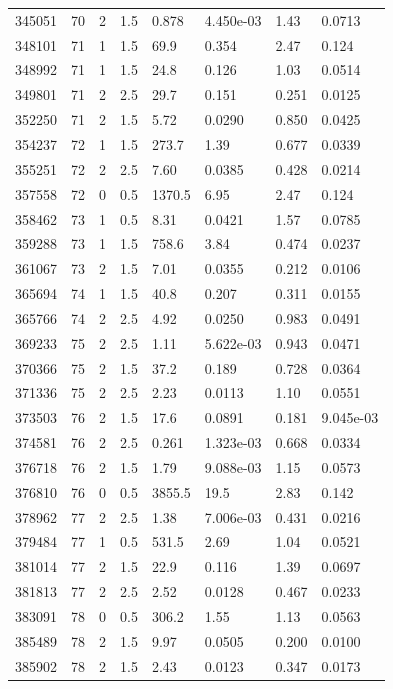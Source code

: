 \documentclass[preview]{standalone}
\begin{document}
{{{{{{\begin{tabular}{L{1.2cm}C{1.2cm} C{0.3cm}C{0.5cm} C{1.4cm}C{1.4cm} C{1.4cm}C{1.4cm}}
  345051  &    70  & 2     & 1.5 &  0.878  & 4.450e-03  & 1.43 &  0.0713   \\ 
  348101  &    71  & 1     & 1.5 &  69.9  & 0.354  & 2.47 &  0.124   \\ 
  348992  &    71  & 1     & 1.5 &  24.8  & 0.126  & 1.03 &  0.0514   \\ 
  349801  &    71  & 2     & 2.5 &  29.7  & 0.151  & 0.251 &  0.0125   \\ 
  352250  &    71  & 2     & 1.5 &  5.72  & 0.0290  & 0.850 &  0.0425   \\ 
  354237  &    72  & 1     & 1.5 &  273.7  & 1.39  & 0.677 &  0.0339   \\ 
  355251  &    72  & 2     & 2.5 &  7.60  & 0.0385  & 0.428 &  0.0214   \\ 
  357558  &    72  & 0     & 0.5 &  1370.5  & 6.95  & 2.47 &  0.124   \\ 
  358462  &    73  & 1     & 0.5 &  8.31  & 0.0421  & 1.57 &  0.0785   \\ 
  359288  &    73  & 1     & 1.5 &  758.6  & 3.84  & 0.474 &  0.0237   \\ 
  361067  &    73  & 2     & 1.5 &  7.01  & 0.0355  & 0.212 &  0.0106   \\ 
  365694  &    74  & 1     & 1.5 &  40.8  & 0.207  & 0.311 &  0.0155   \\ 
  365766  &    74  & 2     & 2.5 &  4.92  & 0.0250  & 0.983 &  0.0491   \\ 
  369233  &    75  & 2     & 2.5 &  1.11  & 5.622e-03  & 0.943 &  0.0471   \\ 
  370366  &    75  & 2     & 1.5 &  37.2  & 0.189  & 0.728 &  0.0364   \\ 
  371336  &    75  & 2     & 2.5 &  2.23  & 0.0113  & 1.10 &  0.0551   \\ 
  373503  &    76  & 2     & 1.5 &  17.6  & 0.0891  & 0.181 &  9.045e-03   \\ 
  374581  &    76  & 2     & 2.5 &  0.261  & 1.323e-03  & 0.668 &  0.0334   \\ 
  376718  &    76  & 2     & 1.5 &  1.79  & 9.088e-03  & 1.15 &  0.0573   \\ 
  376810  &    76  & 0     & 0.5 &  3855.5  & 19.5  & 2.83 &  0.142   \\ 
  378962  &    77  & 2     & 2.5 &  1.38  & 7.006e-03  & 0.431 &  0.0216   \\ 
  379484  &    77  & 1     & 0.5 &  531.5  & 2.69  & 1.04 &  0.0521   \\ 
  381014  &    77  & 2     & 1.5 &  22.9  & 0.116  & 1.39 &  0.0697   \\ 
  381813  &    77  & 2     & 2.5 &  2.52  & 0.0128  & 0.467 &  0.0233   \\ 
  383091  &    78  & 0     & 0.5 &  306.2  & 1.55  & 1.13 &  0.0563   \\ 
  385489  &    78  & 2     & 1.5 &  9.97  & 0.0505  & 0.200 &  0.0100   \\ 
  385902  &    78  & 2     & 1.5 &  2.43  & 0.0123  & 0.347 &  0.0173   \\ 
\hline 
\end{tabular} 

}}}}}}
\end{document}
